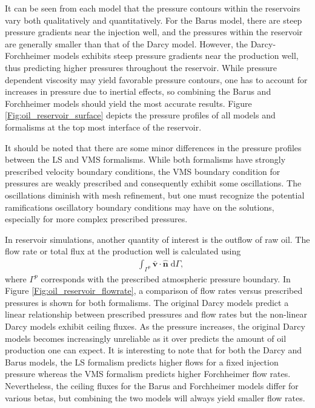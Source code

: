 \documentclass[11pt,reqno]{amsart}
\begin{document}
It can be seen from each model that the pressure contours within the reservoirs vary both qualitatively 
and quantitatively. For the Barus model, there are steep pressure gradients near the 
injection well, and the pressures within the reservoir are generally smaller than that of the Darcy 
model. However, the Darcy-Forchheimer models exhibits steep pressure gradients near the production 
well, thus predicting higher pressures throughout the reservoir. While pressure dependent 
viscosity may yield favorable pressure contours, one has to account for increases in 
pressure due to inertial effects, so combining the Barus and Forchheimer models should 
yield the most accurate results. Figure \ref{Fig:oil_reservoir_surface} depicts the
pressure profiles of all models and formalisms at the top most interface of the reservoir.

It should be noted that there are some minor differences in the pressure profiles 
between the LS and VMS formalisms. While both formalisms have strongly prescribed velocity 
boundary conditions, the VMS boundary condition for pressures are weakly prescribed and 
consequently exhibit some oscillations. The oscillations diminish with mesh refinement, 
but one must recognize the potential ramifications oscillatory boundary conditions 
may have on the solutions, especially for more complex prescribed pressures.

In reservoir simulations, another quantity of interest is the outflow of raw oil. The flow 
rate or total flux at the production well is calculated using
\begin{align}
	&\int_{\Gamma^{p}}\mathbf{\bar{v}}\cdot\mathbf{\hat{n}}\; \mathrm{d}\Gamma,
\end{align}
where $\Gamma^{p}$ corresponds with the prescribed atmospheric pressure boundary. 
In Figure \ref{Fig:oil_reservoir_flowrate}, a comparison of flow rates versus prescribed
pressures is shown for both formalisms. The original Darcy models predict a linear relationship between 
prescribed pressures and flow rates but the non-linear Darcy models exhibit ceiling 
fluxes. As the pressure increases, the original Darcy models becomes increasingly 
unreliable as it over predicts the amount of oil production one can expect.  It is 
interesting to note that for both the Darcy and Barus models, the LS formalism predicts 
higher flows for a fixed injection pressure whereas the VMS formalism predicts higher Forchheimer 
flow rates. Nevertheless, the ceiling fluxes for the Barus and Forchheimer models differ for various 
betas, but combining the two models will always yield smaller flow rates.
\end{document}
